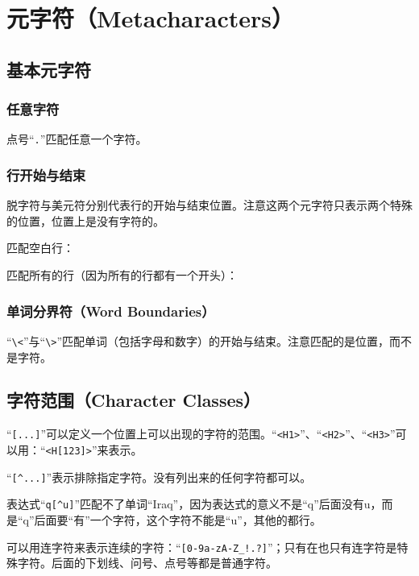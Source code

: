 
\chapter{元字符（Metacharacters）}

\section{基本元字符}

\subsection{任意字符}

点号“\verb|.|”匹配任意一个字符。

\subsection{行开始与结束}

脱字符与美元符分别代表行的开始与结束位置。注意这两个元字符只表示两个特殊的位置，位置上是没有字符的。


匹配空白行：


匹配所有的行（因为所有的行都有一个开头）：


\subsection{单词分界符（Word Boundaries）}

“\verb|\<|”与“\verb|\>|”匹配单词（包括字母和数字）的开始与结束。注意匹配的是位置，而不是字符。



\section{字符范围（Character Classes）}

“\verb|[...]|”可以定义一个位置上可以出现的字符的范围。“\verb|<H1>|”、“\verb|<H2>|”、“\verb|<H3>|”可以用：“\verb|<H[123]>|”来表示。

“\verb|[^...]|”表示排除指定字符。没有列出来的任何字符都可以。

表达式“\verb|q[^u]|”匹配不了单词“Iraq”，因为表达式的意义不是“q”后面没有u，而是“q”后面要“有”一个字符，这个字符不能是“u”，其他的都行。

可以用连字符来表示连续的字符：“\verb|[0-9a-zA-Z_!.?]|”；只有在也只有连字符是特殊字符。后面的下划线、问号、点号等都是普通字符。

